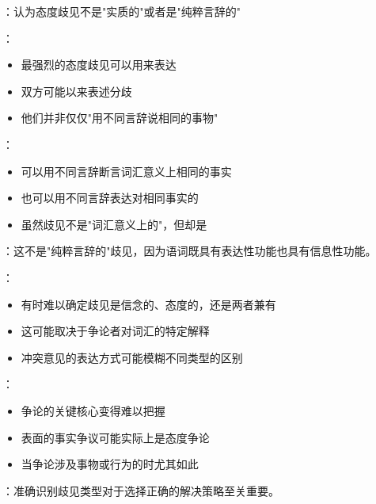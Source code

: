 \begin{theorembox}[title=态度歧见的实质性]
：认为态度歧见不是"实质的"或者是"纯粹言辞的"

：
\begin{itemize}
  \item 最强烈的态度歧见可以用来表达
  \item 双方可能以来表述分歧
  \item 他们并非仅仅"用不同言辞说相同的事物"
\end{itemize}

：
\begin{itemize}
  \item 可以用不同言辞断言词汇意义上相同的事实
  \item 也可以用不同言辞表达对相同事实的
  \item 虽然歧见不是"词汇意义上的"，但却是
\end{itemize}

：这不是"纯粹言辞的"歧见，因为语词既具有表达性功能也具有信息性功能。
\end{theorembox}

\begin{theorembox}[title=歧见类型识别的困难]
：
\begin{itemize}
  \item 有时难以确定歧见是信念的、态度的，还是两者兼有
  \item 这可能取决于争论者对词汇的特定解释
  \item 冲突意见的表达方式可能模糊不同类型的区别
\end{itemize}

：
\begin{itemize}
  \item 争论的关键核心变得难以把握
  \item 表面的事实争议可能实际上是态度争论
  \item 当争论涉及事物或行为的时尤其如此
\end{itemize}

：准确识别歧见类型对于选择正确的解决策略至关重要。
\end{theorembox}

